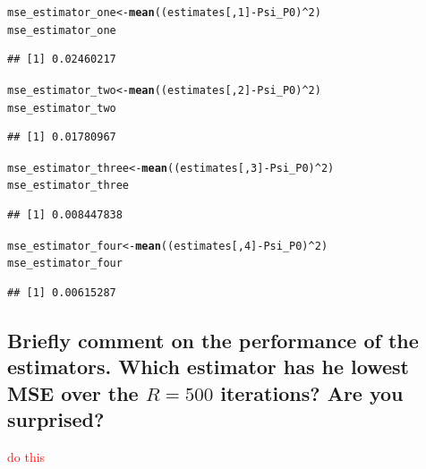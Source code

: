 \documentclass{article}\usepackage[]{graphicx}\usepackage[]{xcolor}
\makeatletter
\newcommand{\hlnum}[1]{\textcolor[rgb]{0.686,0.059,0.569}{#1}}%
\newcommand{\hlopt}[1]{\textcolor[rgb]{0,0,0}{#1}}%
\newcommand{\hlstd}[1]{\textcolor[rgb]{0.345,0.345,0.345}{#1}}%
\newcommand{\hlkwb}[1]{\textcolor[rgb]{0.69,0.353,0.396}{#1}}%
\newcommand{\hlkwd}[1]{\textcolor[rgb]{0.737,0.353,0.396}{\textbf{#1}}}%
\newenvironment{kframe}{%
 \def\at@end@of@kframe{}%
 \ifinner\ifhmode%
  \def\at@end@of@kframe{\end{minipage}}%
  \begin{minipage}{\columnwidth}%
 \fi\fi%
 \def\FrameCommand##1{\hskip\@totalleftmargin \hskip-\fboxsep
 \colorbox{shadecolor}{##1}\hskip-\fboxsep
     \hskip-\linewidth \hskip-\@totalleftmargin \hskip\columnwidth}%
 \MakeFramed {\advance\hsize-\width
   \@totalleftmargin\z@ \linewidth\hsize
   \@setminipage}}%
 {\par\unskip\endMakeFramed%
 \at@end@of@kframe}
\newenvironment{knitrout}{}{} %
\makeatother
\begin{document}
\begin{knitrout}
\color{fgcolor}\begin{kframe}
\begin{alltt}
\hlstd{mse_estimator_one} \hlkwb{<-} \hlkwd{mean}\hlstd{((estimates[,}\hlnum{1}\hlstd{]} \hlopt{-} \hlstd{Psi_P0)}\hlopt{^}\hlnum{2}\hlstd{)}
\hlstd{mse_estimator_one}
\end{alltt}
\begin{verbatim}
## [1] 0.02460217
\end{verbatim}
\begin{alltt}
\hlstd{mse_estimator_two} \hlkwb{<-} \hlkwd{mean}\hlstd{((estimates[,}\hlnum{2}\hlstd{]} \hlopt{-} \hlstd{Psi_P0)}\hlopt{^}\hlnum{2}\hlstd{)}
\hlstd{mse_estimator_two}
\end{alltt}
\begin{verbatim}
## [1] 0.01780967
\end{verbatim}
\begin{alltt}
\hlstd{mse_estimator_three} \hlkwb{<-} \hlkwd{mean}\hlstd{((estimates[,}\hlnum{3}\hlstd{]} \hlopt{-} \hlstd{Psi_P0)}\hlopt{^}\hlnum{2}\hlstd{)}
\hlstd{mse_estimator_three}
\end{alltt}
\begin{verbatim}
## [1] 0.008447838
\end{verbatim}
\begin{alltt}
\hlstd{mse_estimator_four} \hlkwb{<-} \hlkwd{mean}\hlstd{((estimates[,}\hlnum{4}\hlstd{]} \hlopt{-} \hlstd{Psi_P0)}\hlopt{^}\hlnum{2}\hlstd{)}
\hlstd{mse_estimator_four}
\end{alltt}
\begin{verbatim}
## [1] 0.00615287
\end{verbatim}
\end{kframe}
\end{knitrout}

  \subsection{Briefly comment on the performance of the estimators. Which estimator has he lowest MSE over the $R=500$ iterations? Are you surprised?}
  
\textcolor{red}{do this}
 
 
 
 
 
 
 
 
 
 
 
 
 
\end{document}
